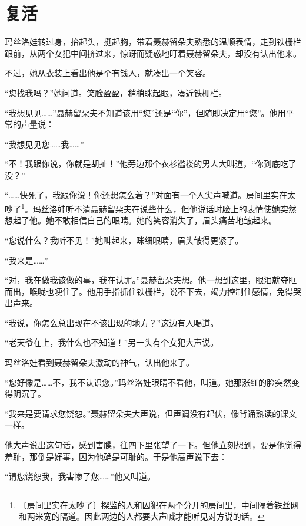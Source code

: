 \documentclass[12pt,UTF-8,openany]{ctexbook}
\begin{document}
\chapter{复活}

\begin{large}
    
    玛丝洛娃转过身，抬起头，挺起胸，带着聂赫留朵夫熟悉的温顺表情，走到铁栅栏跟前，从两个女犯中间挤过来，惊讶而疑惑地盯着聂赫留朵夫，却没有认出他来。
    
    不过，她从衣装上看出他是个有钱人，就凑出一个笑容。
    
    “您找我吗？”她问道。笑脸盈盈，稍稍眯起眼，凑近铁栅栏。
    
    “我想见见……”聂赫留朵夫不知道该用“您”还是“你”，但随即决定用“您”。他用平常的声量说：
    
    “我想见见您……我……”
    
    “不！我跟你说，你就是胡扯！”他旁边那个衣衫褴褛的男人大叫道，“你到底吃了没？”
    
    “……快死了，我跟你说！你还想怎么着？”对面有一个人尖声喊道。房间里实在太吵了\footnote{〔房间里实在太吵了〕探监的人和囚犯在两个分开的房间里，中间隔着铁丝网和两米宽的隔道。因此两边的人都要大声喊才能听见对方说的话。}。玛丝洛娃听不清聂赫留朵夫在说些什么，但他说话时脸上的表情使她突然想起了他。她不敢相信自己的眼睛。她的笑容消失了，眉头痛苦地皱起来。
    
    “您说什么？我听不见！”她叫起来，眯细眼睛，眉头皱得更紧了。
    
    “我来是……”
    
    “对，我在做我该做的事，我在认罪。”聂赫留朵夫想。他一想到这里，眼泪就夺眶而出，喉咙也哽住了。他用手指抓住铁栅栏，说不下去，竭力控制住感情，免得哭出声来。
    
    “我说，你怎么总出现在不该出现的地方？”这边有人喝道。
    
    “老天爷在上，我什么也不知道！”另一头有个女犯大声说。
    
    玛丝洛娃看到聂赫留朵夫激动的神气，认出他来了。
    
    “您好像是……不，我不认识您。”玛丝洛娃眼睛不看他，叫道。她那涨红的脸突然变得阴沉了。
    
    “我来是要请求您饶恕。”聂赫留朵夫大声说，但声调没有起伏，像背诵熟读的课文一样。
    
    他大声说出这句话，感到害臊，往四下里张望了一下。但他立刻想到，要是他觉得羞耻，那倒是好事，因为他确是可耻的。于是他高声说下去：
    
    “请您饶恕我，我害惨了您……”他又叫道。
    

\end{large}
\end{document}
